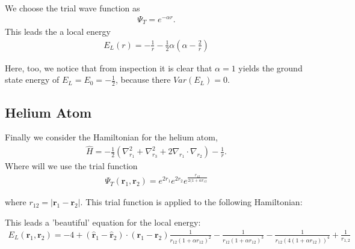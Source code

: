 We choose the trial wave function as
  \begin{align}
    \Psi_T = e^{-\alpha r}.
  \end{align}
This leads the a local energy
  \begin{align}
    E_L(r) = - \frac{1}{r} - \frac{1}{2}\alpha(\alpha - \frac{2}{r})
  \end{align}

Here, too, we notice that from inspection it is clear that $\alpha = 1$ yields the ground state energy of $E_L = E_0 = -\frac{1}{2}$, because there $Var(E_L) = 0$.




\subsection{Helium Atom}
Finally we consider the Hamiltonian for the helium atom,
\begin{align}
  \hat{H} = -\frac{1}{2}(\nabla_{r_1}^2 + \nabla_{r_3}^2 + 2\nabla_{r_1}\cdot \nabla_{r_2}) - \frac{1}{r}.
\end{align}
Where will we use the trial function
  \begin{align}
    \Psi_T (\textbf{r}_1,\textbf{r}_2) = e^{2r_1}e^{2r_2}e^{\frac{r_{12}}{2(1+\alpha r_{12}}}
  \end{align}

where $r_{12} = |\textbf{r}_1 - \textbf{r}_2 |$. This trial function is applied to the following Hamiltonian:


This leads a 'beautiful' equation for the local energy:
  \begin{align}
    E_L(\textbf{r}_1,\textbf{r}_2) = -4  + (\hat{\textbf{r}}_1 - \hat{\textbf{r}}_2) \cdot (\textbf{r}_1 - \textbf{r}_2) \frac{1}{r_{12}(1+\alpha r_{12})^2} -  \frac{1}{r_{12}(1+\alpha r_{12})^3} - \frac{1}{r_{12}(4(1+\alpha r_{12}))^4} + \frac{1}{r_{1,2}}   \end{align}
